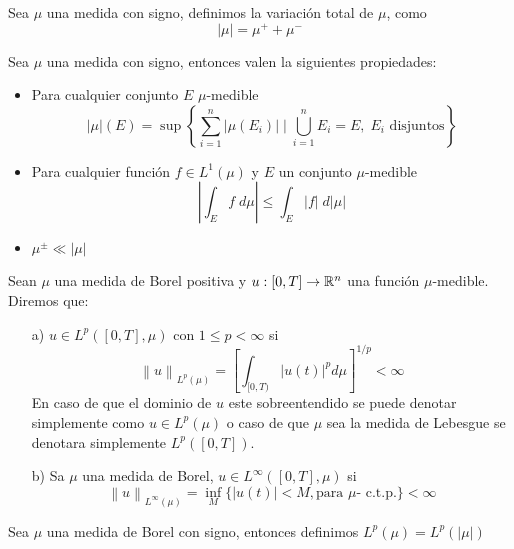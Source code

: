 \begin{defi}
    Sea $\mu$ una medida con signo, definimos la variación total de $\mu$, como 
    \begin{equation*}
        |\mu|=\mu^+ +\mu^-
    \end{equation*}\index[Simbolo]{$\vert\mu\vert$}
    
\end{defi}
\begin{obs}
 Sea $\mu$ una medida con signo, entonces valen la siguientes propiedades: \label{obs:medida}
 \begin{itemize}
     \item Para cualquier conjunto $E$ $\mu$-medible
 \begin{equation}
     |\mu|(E)=\sup\left\{\sum_{i=1}^n|\mu(E_i)| \mid \bigcup_{i=1}^nE_i=E, \; E_i \text{ disjuntos}  \right\}
 \end{equation}
 
 \item Para cualquier función $f\in L^1(\mu)$ y $E$ un conjunto $\mu$-medible
 $$\left|\int_Ef\;d\mu\right|\leq \int_E|f|\; d|\mu|$$
 \item $ \mu^{\pm}\ll |\mu|$
 \end{itemize}
\end{obs}

\begin{defi} 
	Sean $\mu$ una medida de Borel positiva y  $u:[0,T]\to \mathbb{R}^n$ una función $\mu$-medible. Diremos que:
	\begin{enumerate}
		\item [a)] $u\in L^p([0,T],\mu)$   con $1\leq p<\infty$ si 
		 $$\left\| u\right\|_{L^p(\mu)} =\left[ \int_{[0,T)}|u(t)|^p d\mu\right] ^{1/p}<\infty$$
		En caso de que el dominio de $u$ este sobreentendido se puede denotar simplemente como $u\in L^p(\mu)$ o caso de que $\mu$ sea la medida de Lebesgue se denotara simplemente $L^p([0,T])$.
		\item [b)] Sa $\mu$ una medida de Borel, $u\in L^\infty([0,T],\mu)$ si 
		$$\left\| u\right\|_{L^\infty(\mu)}=\inf_{M}\{|u(t)|<M, \text{para } \mu \text{- c.t.p.}\}  <\infty$$
		
	\end{enumerate}
\end{defi}
\begin{defi}
	Sea $\mu$ una medida de Borel con signo, entonces definimos $L^p(\mu)=L^p(|\mu|)$
\end{defi}




